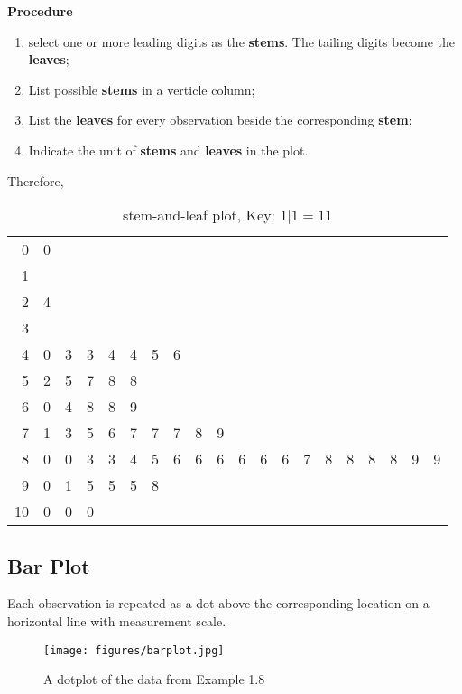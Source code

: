 \textbf{Procedure}

\begin{enumerate}
  \item select one or more leading digits as the \textbf{stems}. The tailing digits become the \textbf{leaves};
  \item List possible \textbf{stems} in a verticle column;
  \item List the \textbf{leaves} for every observation beside the corresponding \textbf{stem};
  \item Indicate the unit of \textbf{stems} and \textbf{leaves} in the plot.
\end{enumerate}

Therefore,
\begin{table}[H]
  \centering
  \caption{stem-and-leaf plot, Key: $1 | 1= 11$}
    \begin{tabular}{r|lllllllllllllllllll}
    0     & 0   \\
    1     \\
    2     & 4   \\
    3     \\
    4     & 0   & 3   & 3   & 4   & 4   & 5   & 6  \\
    5     & 2   & 5   & 7   & 8   & 8  \\
    6     & 0   & 4   & 8   & 8   & 9\\
    7     & 1   & 3   & 5   & 6   & 7   & 7   & 7   & 8   & 9   \\
    8     & 0   & 0   & 3   & 3   & 4   & 5   & 6   & 6   & 6   & 6   & 6   & 6   & 7   & 8   & 8   & 8   & 8   & 9   & 9  \\
    9     & 0   & 1   & 5   & 5   & 5   & 8   \\
    10    & 0   & 0   & 0 \\
    \end{tabular}
\end{table}


\subsection{Bar Plot}
Each observation is repeated as a dot above the corresponding location on a horizontal line with measurement scale.

\begin{figure}[htbp]
\centering
\texttt{[image: figures/barplot.jpg]}
\caption{A dotplot of the data from Example 1.8}
\label{fig:1}
\end{figure}


